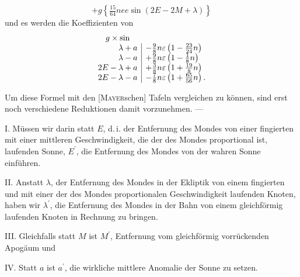 \[
+g\left\{\tfrac{15}{64}nee\sin(2E-2M+\lambda)\right\}
\]
\noindent und es werden die Koeffizienten von
\[
\begin{array}{r|l}
\multicolumn{1}{c}{g\times\sin}&\\
\lambda+a&-\tfrac98n\varepsilon\left(1-\tfrac{23}{24}n\right)\\
\lambda-a&+\tfrac98n\varepsilon\left(1-\tfrac18n\right)\\
2E-\lambda+a&+\tfrac38n\varepsilon\left(1+\tfrac{19}{8}n\right)\\
2E-\lambda-a&-\tfrac78n\varepsilon\left(1+\tfrac{65}{56}n\right).
\end{array}
\]
\par\noindent\hspace*{\parindent}Um diese Formel mit den [\textsc{Mayer}schen] Tafeln vergleichen zu können,
sind erst noch verschiedene Reduktionen damit vorzunehmen. —

\par\noindent\hspace*{\parindent}I. Müssen wir darin statt \(E\), d.\,i. der Entfernung des Mondes von einer
fingierten mit einer mittleren Geschwindigkeit, die der des Mondes proportional
ist, laufenden Sonne, \(E^{\prime}\), die Entfernung des Mondes von der wahren Sonne
einführen.

\par\noindent\hspace*{\parindent}II. Anstatt \(\lambda\), der Entfernung des Mondes in der Ekliptik von einem
fingierten und mit einer der des Mondes proportionalen Geschwindigkeit
laufenden Knoten, haben wir \(\lambda^{\prime}\), die Entfernung des Mondes in der Bahn
von einem gleichförmig laufenden Knoten in Rechnung zu bringen.

\par\noindent\hspace*{\parindent}III. Gleichfalls statt \(M\) ist \(M^{\prime}\), Entfernung vom gleichförmig vorrückenden
Apogäum und

\par\noindent\hspace*{\parindent}IV. Statt \(a\) ist \(a^{\prime}\), die wirkliche mittlere Anomalie der Sonne zu setzen.

